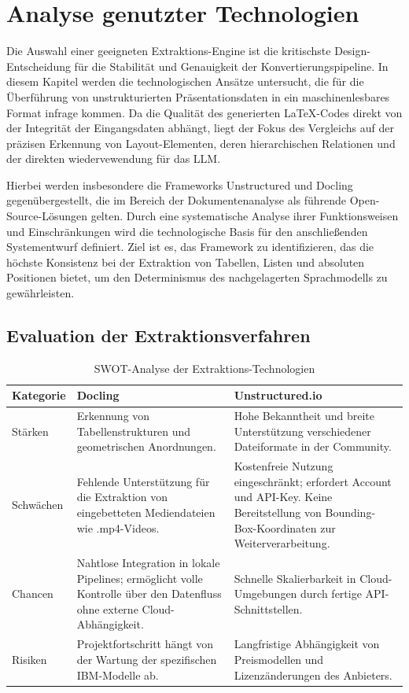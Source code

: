 \documentclass[a4paper]{article}
\begin{document}
\section{Analyse genutzter Technologien}
\label{sec:tech_analysis}


Die Auswahl einer geeigneten Extraktions-Engine ist die kritischste Design-Entscheidung für die Stabilität und Genauigkeit der Konvertierungspipeline. In diesem Kapitel werden die technologischen Ansätze untersucht, die für die Überführung von unstrukturierten Präsentationsdaten in ein maschinenlesbares Format infrage kommen. Da die Qualität des generierten LaTeX-Codes direkt von der Integrität der Eingangsdaten abhängt, liegt der Fokus des Vergleichs auf der präzisen Erkennung von Layout-Elementen, deren hierarchischen Relationen und der direkten wiedervewendung für das LLM.

Hierbei werden insbesondere die Frameworks Unstructured und Docling gegenübergestellt, die im Bereich der Dokumentenanalyse als führende Open-Source-Lösungen gelten. Durch eine systematische Analyse ihrer Funktionsweisen und Einschränkungen wird die technologische Basis für den anschließenden Systementwurf definiert. Ziel ist es, das Framework zu identifizieren, das die höchste Konsistenz bei der Extraktion von Tabellen, Listen und absoluten Positionen bietet, um den Determinismus des nachgelagerten Sprachmodells zu gewährleisten.


\subsection{Evaluation der Extraktionsverfahren}
\label{sub_swot_analysis}

\begin{table}[h]
	\centering
	\caption{SWOT-Analyse der Extraktions-Technologien}
	\label{tab:swot_comparison}
	\begin{tabularx}{\textwidth}{l X X}
		\toprule
		\rowcolor{gray!10} Kategorie & Docling & Unstructured.io \\
		\midrule
		Stärken & Erkennung von Tabellenstrukturen und geometrischen Anordnungen. & Hohe Bekanntheit und breite Unterstützung verschiedener Dateiformate in der Community. \\
		\addlinespace
		Schwächen & Fehlende Unterstützung für die Extraktion von eingebetteten Mediendateien wie .mp4-Videos. & Kostenfreie Nutzung eingeschränkt; erfordert Account und API-Key. Keine Bereitstellung von Bounding-Box-Koordinaten zur Weiterverarbeitung. \\
		\addlinespace
		Chancen & Nahtlose Integration in lokale Pipelines; ermöglicht volle Kontrolle über den Datenfluss ohne externe Cloud-Abhängigkeit. & Schnelle Skalierbarkeit in Cloud-Umgebungen durch fertige API-Schnittstellen. \\
		\addlinespace
		Risiken & Projektfortschritt hängt von der Wartung der spezifischen IBM-Modelle ab. & Langfristige Abhängigkeit von Preismodellen und Lizenzänderungen des Anbieters. \\
		\bottomrule
	\end{tabularx}
\end{table}
\end{document}

